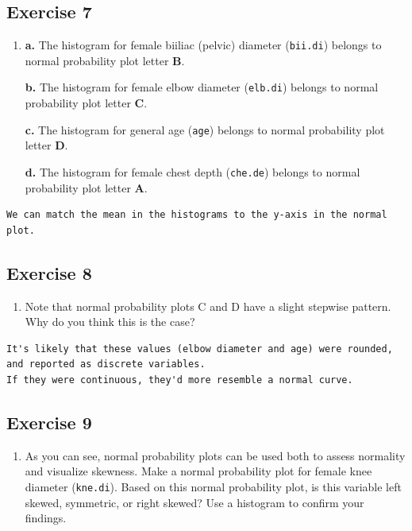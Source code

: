 \documentclass[]{article}
\providecommand{\tightlist}{%
  \setlength{\itemsep}{0pt}\setlength{\parskip}{0pt}}
\begin{document}
\subsection{Exercise 7}\label{exercise-7}

\begin{enumerate}
\def\labelenumi{\arabic{enumi}.}
\setcounter{enumi}{6}
\item
  \textbf{a.} The histogram for female biiliac (pelvic) diameter
  (\texttt{bii.di}) belongs to normal probability plot letter
  \textbf{B}.

  \textbf{b.} The histogram for female elbow diameter (\texttt{elb.di})
  belongs to normal probability plot letter \textbf{C}.

  \textbf{c.} The histogram for general age (\texttt{age}) belongs to
  normal probability plot letter \textbf{D}.

  \textbf{d.} The histogram for female chest depth (\texttt{che.de})
  belongs to normal probability plot letter \textbf{A}.
\end{enumerate}

\begin{verbatim}
We can match the mean in the histograms to the y-axis in the normal plot.
\end{verbatim}

\subsection{Exercise 8}\label{exercise-8}

\begin{enumerate}
\def\labelenumi{\arabic{enumi}.}
\setcounter{enumi}{7}
\tightlist
\item
  Note that normal probability plots C and D have a slight stepwise
  pattern.\\
  Why do you think this is the case?
\end{enumerate}

\begin{verbatim}
It's likely that these values (elbow diameter and age) were rounded, and reported as discrete variables.
If they were continuous, they'd more resemble a normal curve.
\end{verbatim}

\subsection{Exercise 9}\label{exercise-9}

\begin{enumerate}
\def\labelenumi{\arabic{enumi}.}
\setcounter{enumi}{2}
\tightlist
\item
  As you can see, normal probability plots can be used both to assess
  normality and visualize skewness. Make a normal probability plot for
  female knee diameter (\texttt{kne.di}). Based on this normal
  probability plot, is this variable left skewed, symmetric, or right
  skewed? Use a histogram to confirm your findings.
\end{enumerate}
\end{document}
